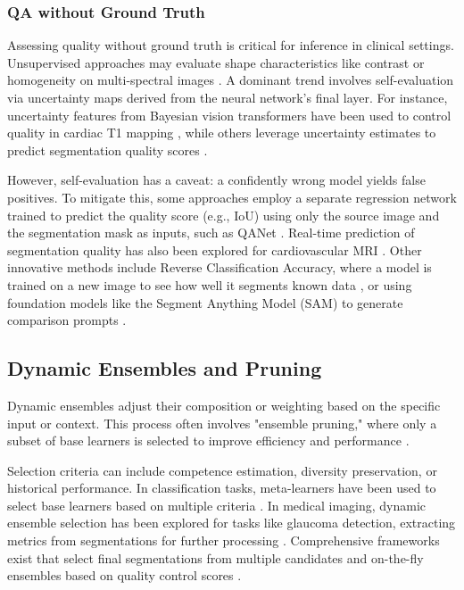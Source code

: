 \subsubsection{QA without Ground Truth}
Assessing quality without ground truth is critical for inference in clinical settings. Unsupervised
approaches may evaluate shape characteristics like contrast or homogeneity on multi-spectral images
\cite{chabrier2004unsupervised}. A dominant trend involves self-evaluation via uncertainty maps
derived from the neural network's final layer. For instance, uncertainty features from Bayesian
vision transformers have been used to control quality in cardiac T1 mapping
\cite{arega2023automatic}, while others leverage uncertainty estimates to predict segmentation
quality scores \cite{devries2018leveraging}.

However, self-evaluation has a caveat: a confidently wrong model yields false positives. To
mitigate this, some approaches employ a separate regression network trained to predict the quality
score (e.g., IoU) using only the source image and the segmentation mask as inputs, such as QANet
\cite{arbelle2019qanet}. Real-time prediction of segmentation quality has also been explored for
cardiovascular MRI \cite{robinson2018real}. Other innovative methods include Reverse Classification
Accuracy, where a model is trained on a new image to see how well it segments known data
\cite{valindria2017reverse}, or using foundation models like the Segment Anything Model (SAM) to
generate comparison prompts \cite{zhang2023sqa}.

\subsection{Dynamic Ensembles and Pruning}
Dynamic ensembles adjust their composition or weighting based on the specific input or context.
This process often involves "ensemble pruning," where only a subset of base learners is selected to
improve efficiency and performance \cite{bian2019ensemble}.

Selection criteria can include competence estimation, diversity preservation, or historical
performance. In classification tasks, meta-learners have been used to select base learners based on
multiple criteria \cite{markatopoulou2015dynamic, swaminathan2022meta}. In medical imaging, dynamic
ensemble selection has been explored for tasks like glaucoma detection, extracting metrics from
segmentations for further processing \cite{zulfira2021segmentation}. Comprehensive frameworks exist
that select final segmentations from multiple candidates and on-the-fly ensembles based on quality
control scores \cite{gonzales2023quality}.

